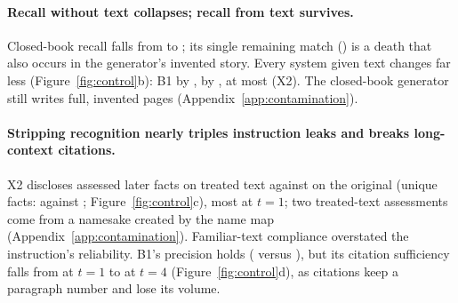 \paragraph{Recall without text collapses; recall from text survives.}
Closed-book recall falls from  to ; its
single remaining match () is a death that also occurs in the
generator's invented story. Every system given text changes far less
(Figure~\ref{fig:control}b): B1 by , \sys by
, at most  (X2). The closed-book
generator still writes full, invented pages (Appendix~\ref{app:contamination}).

\paragraph{Stripping recognition nearly triples instruction leaks and breaks long-context citations.}
X2 discloses  assessed later facts on treated text against
 on the original (unique facts:  against
; Figure~\ref{fig:control}c), most at $t=1$; two treated-text assessments
come from a namesake created by the name map (Appendix~\ref{app:contamination}).
Familiar-text compliance overstated the instruction's reliability. B1's precision holds
( versus ), but its citation sufficiency
falls from  at $t=1$ to  at $t=4$
(Figure~\ref{fig:control}d), as citations keep a paragraph number and lose its volume.

